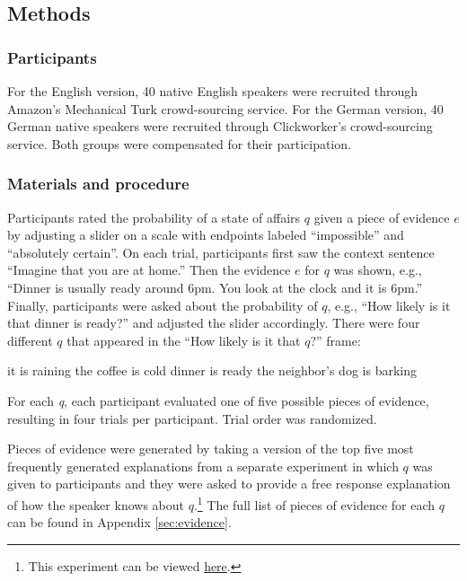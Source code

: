 \documentclass[11pt]{article}
\newcommand{\appref}[1]{Appendix \ref{#1}}
\begin{document}
\subsection{Methods}

\subsubsection{Participants}

For the English version, 40 native English speakers were recruited through Amazon's Mechanical Turk crowd-sourcing service. For the German version, 40 German native speakers were recruited through Clickworker's crowd-sourcing service. Both groups were compensated for their participation.

\subsubsection{Materials and procedure}

Participants rated the probability of a state of affairs $q$ given a piece of evidence $e$ by adjusting a slider on a scale with endpoints labeled ``impossible'' and ``absolutely certain''. On each trial, participants first saw the context sentence ``Imagine that you are at home.'' Then the evidence $e$ for $q$ was shown, e.g., ``Dinner is usually ready around 6pm. You look at the clock and it is 6pm.'' Finally, participants were asked about the probability of $q$, e.g., ``How likely is it that dinner is ready?'' and adjusted the slider accordingly. There were four different $q$ that appeared in the ``How likely is it that $q$?'' frame:

\begin{exe}
	\ex it is raining
	\ex the coffee is cold
	\ex dinner is ready
	\ex the neighbor's dog is barking
\end{exe}

For each \emph{q}, each participant evaluated one of five possible pieces of evidence, resulting in four trials per participant. Trial order was randomized. 

Pieces of evidence were generated by taking a version of the top five most frequently generated explanations from a separate experiment in which $q$ was given to participants and they were asked to provide a free response explanation of how the speaker knows about $q$.\footnote{This experiment can be viewed \href{http://stanford.edu/~jdegen/68_modals_freeproduction/modals.html}{here}.} The full list of pieces of evidence for each $q$ can be found in \appref{sec:evidence}.
\end{document}
